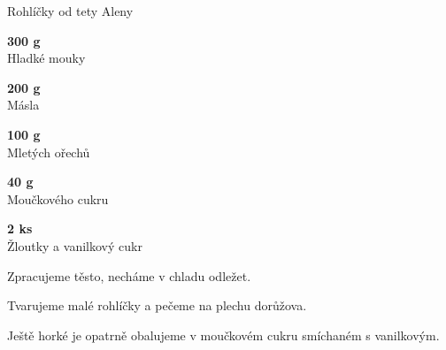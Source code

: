 \documentclass[11pt,a4paper]{article}
\begin{document}
\begin{recipe}[NavyBlue]{Rohlíčky od tety Aleny}
    \begin{ingredients}
        \item \parbox[t]{\linewidth}{\raggedright \weight \textbf{300 g}\\ Hladké mouky}
        \item \parbox[t]{\linewidth}{\raggedright \weight \textbf{200 g}\\ Másla}
        \item \parbox[t]{\linewidth}{\raggedright \weight \textbf{100 g}\\ Mletých ořechů}
        \item \parbox[t]{\linewidth}{\raggedright \weight \textbf{40 g}\\ Moučkového cukru}
        \item \parbox[t]{\linewidth}{\raggedright \piece \textbf{2 ks}\\ Žloutky a vanilkový cukr}
    \end{ingredients}
    \begin{steps}
        \item Zpracujeme těsto, necháme v chladu odležet.
        \item Tvarujeme malé rohlíčky a pečeme na plechu dorůžova.
        \item Ještě horké je opatrně obalujeme v moučkovém cukru smíchaném s vanilkovým.
    \end{steps}
\end{recipe}
\end{document}
